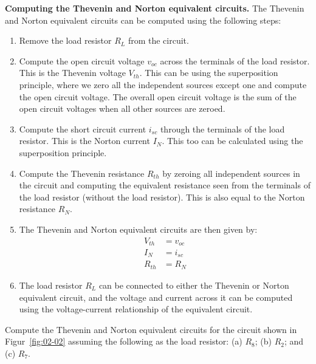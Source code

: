\noindent\textbf{Computing the Thevenin and Norton equivalent circuits.} The Thevenin and Norton equivalent circuits can be computed using the following steps:
\begin{enumerate}
    \item Remove the load resistor $R_L$ from the circuit.
    \item Compute the open circuit voltage $v_{oc}$ across the terminals of the load resistor. This is the Thevenin voltage $V_{th}$. This can be using the superposition principle, where we zero all the independent sources except one and compute the open circuit voltage. The overall open circuit voltage is the sum of the open circuit voltages when all other sources are zeroed.
    \item Compute the short circuit current $i_{sc}$ through the terminals of the load resistor. This is the Norton current $I_{N}$. This too can be calculated using the superposition principle.
    \item Compute the Thevenin resistance $R_{th}$ by zeroing all independent sources in the circuit and computing the equivalent resistance seen from the terminals of the load resistor (without the load resistor). This is also equal to the Norton resistance $R_{N}$.
    \item The Thevenin and Norton equivalent circuits are then given by:
    \begin{equation}
        \begin{split}
            V_{th} &= v_{oc}\\
            I_{N} &= i_{sc}\\
            R_{th} &= R_{N}
        \end{split}
        \label{eq:02-23}
    \end{equation}
    \item The load resistor $R_L$ can be connected to either the Thevenin or Norton equivalent circuit, and the voltage and current across it can be computed using the voltage-current relationship of the equivalent circuit.
\end{enumerate}

\begin{boxedstuff}
    \begin{problem}
        Compute the Thevenin and Norton equivalent circuits for the circuit shown in Figur~\ref{fig:02-02} assuming the following as the load resistor: (a) $R_8$; (b) $R_2$; and (c) $R_7$.
    \end{problem}
\end{boxedstuff}

